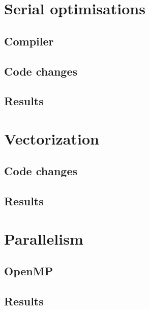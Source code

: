 \documentclass[11pt, a4paper]{article}
\begin{document}
\section{Serial optimisations}

\subsection{Compiler}

\subsection{Code changes}

\subsection{Results}

\section{Vectorization}

\subsection{Code changes}

\subsection{Results}

\section{Parallelism}

\subsection{OpenMP}

\subsection{Results}

\clearpage

\onecolumn{
  \printbibliography
}
\end{document}
